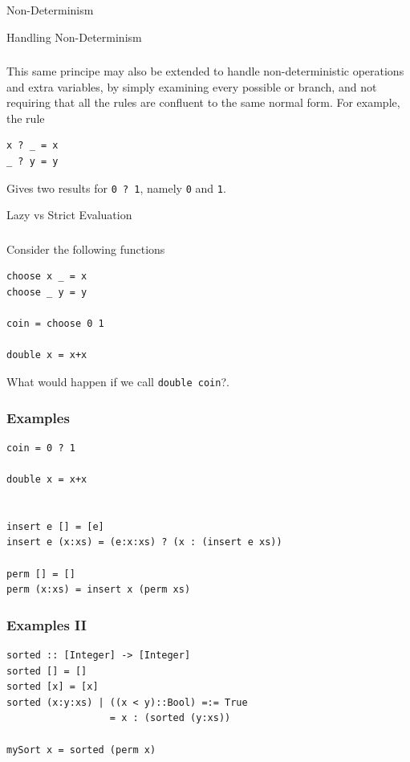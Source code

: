 \documentclass{beamer}
\begin{document}
\begin{section}{Non-Determinism}

\begin{subsection}{Handling Non-Determinism}
\begin{frame}[fragile]
\frametitle{\subsecname}
  This same principe may also be extended to handle non-deterministic operations and extra variables, by simply examining every possible or branch, and not requiring that all the rules are confluent to the same normal form. For example, the rule

\begin{verbatim}
x ? _ = x
_ ? y = y
\end{verbatim}

  Gives two results for \verb|0 ? 1|, namely \verb|0| and \verb|1|.
  
\end{frame}

\end{subsection}
\begin{subsection}{Lazy vs Strict Evaluation}
\begin{frame}
[fragile]
\frametitle{\subsecname}
  Consider the following functions
\begin{verbatim}
choose x _ = x
choose _ y = y

coin = choose 0 1

double x = x+x
\end{verbatim}
What would happen if we call \verb|double coin|?.
\end{frame}
\begin{frame}
[fragile]
\frametitle{{\subsecname} Examples}
\begin{example}
\begin{verbatim}
coin = 0 ? 1

double x = x+x


insert e [] = [e]
insert e (x:xs) = (e:x:xs) ? (x : (insert e xs))

perm [] = []
perm (x:xs) = insert x (perm xs)
\end{verbatim}
\end{example}
\end{frame}
\begin{frame}
[fragile]
\frametitle{{\subsecname} Examples II}
\begin{example}
\begin{verbatim}
sorted :: [Integer] -> [Integer]
sorted [] = []
sorted [x] = [x]
sorted (x:y:xs) | ((x < y)::Bool) =:= True 
                  = x : (sorted (y:xs))

mySort x = sorted (perm x)
\end{verbatim}
\end{example}
\end{frame}
\end{subsection}
\end{section}
\end{document}
